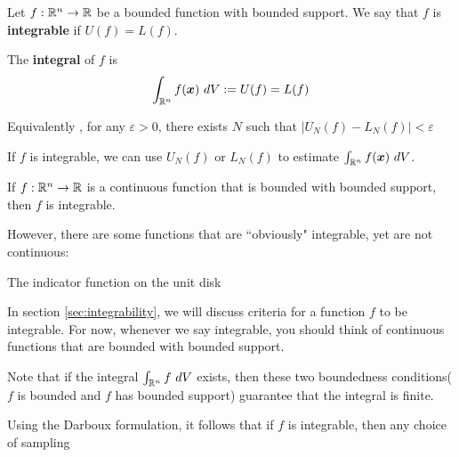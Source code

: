     \begin{remark}
    \end{remark}

\begin{definition}\label{def:integrable}
    Let $f: \mathbb{R}^n \to \mathbb{R}$ be a bounded function with bounded support.
    We say that $f$ is \textbf{integrable} if $U(f) = L(f)$.
    
    The \textbf{integral} of $f$ is $$\int_{\mathbb{R}^n} f(\bm{x}) \ dV := U(f) = L(f)$$

    Equivalently , for any $\varepsilon > 0$,
    there exists $N$ such that $|U_N(f) - L_N(f)| < \varepsilon$
    \end{definition}

    

    
    \begin{corollary}
    If $f$ is integrable, we can use $U_N(f)$ or $L_N(f)$ to estimate $\int_{\R^n} f(\bm{x}) \ dV$. 
    \end{corollary}

    \begin{example}
        
    \begin{theorem}
     If $f : \mathbb{R}^n \to \mathbb{R}$ is a continuous function that is bounded with bounded support, then $f$ is integrable.   
    \end{theorem}
    \end{example}

    
However, there are some functions that are ``obviously" integrable, yet are not continuous:

\begin{example}
    The indicator function on the unit disk
\end{example}
    
    In section \ref{sec:integrability}, we will discuss criteria for a function $f$ to be integrable.  For now, whenever we say integrable, you should think of continuous functions that are bounded with bounded support.



\begin{remark}
Note that if the integral $\int_{\R^n} f \ dV$ exists, then these two boundedness conditions($f$ is bounded and $f$ has bounded support) guarantee that the integral is finite.    
\end{remark}


\begin{remark}
    Using the Darboux formulation, it follows that if $f$ is integrable, then any choice of sampling  
\end{remark}



